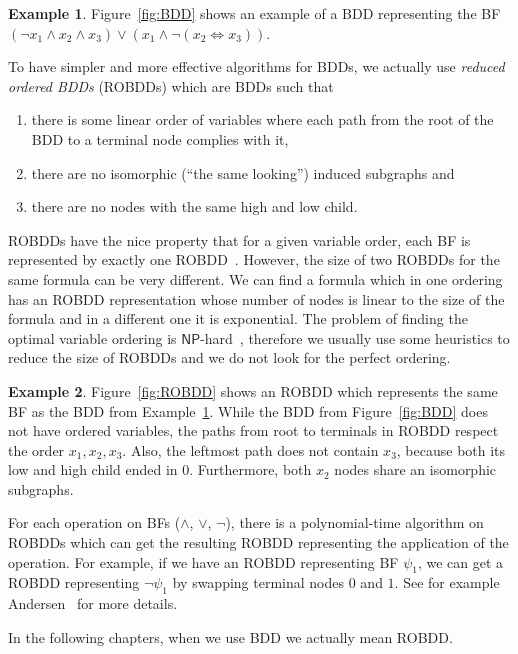 \documentclass[
  digital, %
  color,
  twoside, %
  table,   %
  nolof,     %
  nolot,     %
]{fithesis3}
\theoremstyle{definition}
\newtheorem{example}{Example}
\theoremstyle{remark}
\newcommand{\lequal}{\Leftrightarrow}
\newcommand{\ComplexityFont}[1]{\mathsf{#1}}
\newcommand{\NP}{\ComplexityFont{NP}}
\begin{document}
\begin{example}
\label{ex:BDD}
Figure~\ref{fig:BDD} shows an example of a BDD representing the BF $(\neg x_1 \land x_2 \land x_3) \lor (x_1 \land \neg (x_2 \lequal x_3))$. 
\end{example}

To have simpler and more effective algorithms for BDDs, we actually use \emph{reduced ordered BDDs} (ROBDDs) which are BDDs such that 
\begin{enumerate}
    \item there is some linear order of variables where each path from the root of the BDD to a terminal node complies with it,
    \item there are no isomorphic (``the same looking'') induced subgraphs and
    \item there are no nodes with the same high and low child.
\end{enumerate}
ROBDDs have the nice property that for a given variable order, each BF is represented by exactly one ROBDD~\cite{BDD}. However, the size of two ROBDDs for the same formula can be very different. We can find a formula which in one ordering has an ROBDD representation whose number of nodes is linear to the size of the formula and in a different one it is exponential. The problem of finding the optimal variable ordering is $\NP$-hard~\cite{BDDoptimalorderisNP}, therefore we usually use some heuristics to reduce the size of ROBDDs and we do not look for the perfect ordering.

\begin{example}
\label{ex:ROBDD}
Figure~\ref{fig:ROBDD} shows an ROBDD which represents the same BF as the BDD from Example~\ref{ex:BDD}. While the BDD from Figure~\ref{fig:BDD} does not have ordered variables, the paths from root to terminals in ROBDD respect the order $x_1,x_2,x_3$. Also, the leftmost path does not contain $x_3$, because both its low and high child ended in $0$. Furthermore, both $x_2$ nodes share an isomorphic subgraphs.
\end{example}

For each operation on BFs (${\land}$, ${\lor}$, ${\neg}$), there is a polynomial-time algorithm on ROBDDs which can get the resulting ROBDD representing the application of the operation. For example, if we have an ROBDD representing BF $\psi_1$, we can get a ROBDD representing $\neg \psi_1$ by swapping terminal nodes $0$ and $1$. See for example Andersen~\cite{BDDdetails} for more details.

In the following chapters, when we use BDD we actually mean ROBDD.
\end{document}
